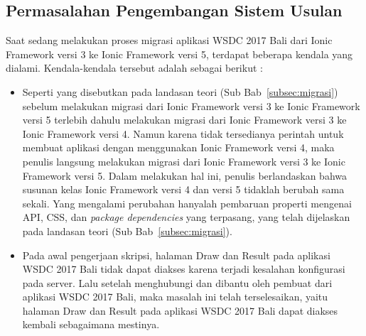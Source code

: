 %

\subsection{Permasalahan Pengembangan Sistem Usulan}
\label{sec:analisisPermasalahanSistemKini}
Saat sedang melakukan proses migrasi aplikasi WSDC 2017 Bali dari Ionic Framework versi 3 ke Ionic Framework versi 5, terdapat beberapa kendala yang dialami. Kendala-kendala tersebut adalah sebagai berikut : 
\begin{itemize}
	\item Seperti yang disebutkan pada landasan teori (Sub Bab~\ref{subsec:migrasi}) sebelum melakukan migrasi dari Ionic Framework versi 3 ke Ionic Framework versi 5 terlebih dahulu melakukan migrasi dari Ionic Framework versi 3 ke Ionic Framework versi 4. Namun karena tidak tersedianya perintah untuk membuat aplikasi dengan menggunakan Ionic Framework versi 4, maka penulis langsung melakukan migrasi dari Ionic Framework versi 3 ke Ionic Framework versi 5. Dalam melakukan hal ini, penulis berlandaskan bahwa susunan kelas Ionic Framework versi 4 dan versi 5 tidaklah berubah sama sekali. Yang mengalami perubahan hanyalah pembaruan properti mengenai API, CSS, dan {\it package dependencies} yang terpasang, yang telah dijelaskan pada landasan teori (Sub Bab~\ref{subsec:migrasi}).

\newpage	
	
	\item Pada awal pengerjaan skripsi, halaman Draw dan Result pada aplikasi WSDC 2017 Bali tidak dapat diakses karena terjadi kesalahan konfigurasi pada server. Lalu setelah menghubungi dan dibantu oleh pembuat dari aplikasi WSDC 2017 Bali, maka masalah ini telah terselesaikan, yaitu halaman Draw dan Result pada aplikasi WSDC 2017 Bali dapat diakses kembali sebagaimana mestinya.
\end{itemize}
